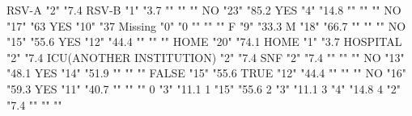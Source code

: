 \documentclass{article}\usepackage[]{graphicx}\usepackage[]{color}
\begin{document}
RSV-A                               "2"            "7.4%
RSV-B                               "1"            "3.7%
                                    ""             ""      ""         
NO                                  "23"           "85.2%
YES                                 "4"            "14.8%
                                    ""             ""      ""         
NO                                  "17"           "63%
YES                                 "10"           "37%
Missing                             "0"            "0%
                                    ""             ""      ""         
F                                   "9"            "33.3%
M                                   "18"           "66.7%
                                    ""             ""      ""         
NO                                  "15"           "55.6%
YES                                 "12"           "44.4%
                                    ""             ""      ""         
HOME                                "20"           "74.1%
HOME                                "1"            "3.7%
HOSPITAL                            "2"            "7.4%
ICU(ANOTHER INSTITUTION)            "2"            "7.4%
SNF                                 "2"            "7.4%
                                    ""             ""      ""         
NO                                  "13"           "48.1%
YES                                 "14"           "51.9%
                                    ""             ""      ""         
FALSE                               "15"           "55.6%
TRUE                                "12"           "44.4%
                                    ""             ""      ""         
NO                                  "16"           "59.3%
YES                                 "11"           "40.7%
                                    ""             ""      ""         
0                                   "3"            "11.1%
1                                   "15"           "55.6%
2                                   "3"            "11.1%
3                                   "4"            "14.8%
4                                   "2"            "7.4%
                                    ""             ""      ""         
\end{document}
